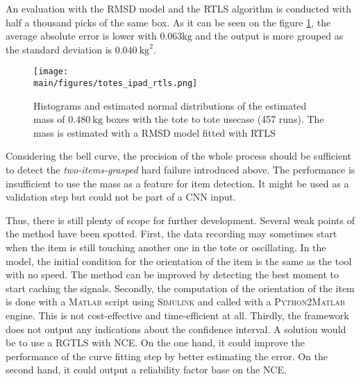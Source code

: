 \documentclass[/home/francois/latex/report/main.tex]{subfiles}
\begin{document}
An evaluation with the \ac{RMSD} model and the \ac{RTLS} algorithm is conducted with half a thousand picks of the same box. As it can be seen on the figure \ref{fig:results:rmsd-rtls-tote}, the average absolute error is lower with $0.063 \si{\kilogram}$ and the output is more grouped as the standard deviation is $0.040 \ \si{\kilogram\squared}$.

\begin{figure}[h]
  \centering
  \texttt{[image: \\main/figures/totes\_ipad\_rtls.png]}
  \caption{Histograms and estimated normal distributions of the estimated mass of $0.480 \ \si{\kilogram}$ boxes with the tote to tote usecase (457 runs). The mass is estimated with a \ac{RMSD} model fitted with \ac{RTLS}}
  \label{fig:results:rmsd-rtls-tote}
\end{figure}

Considering the bell curve, the precision of the whole process should be sufficient to detect the \textit{two-items-grasped} hard failure introduced above. The performance is insufficient to use the mass as a feature for item detection. It might be used as a validation step but could not be part of a \ac{CNN} input.

Thus, there is still plenty of scope for further development. Several weak points of the method have been spotted. First, the data recording may sometimes start when the item is still touching another one in the tote or oscillating. In the model, the initial condition for the orientation of the item is the same as the tool with no speed. The method can be improved by detecting the best moment to start caching the signals. Secondly, the computation of the orientation of the item is done with a \textsc{Matlab} script using \textsc{Simulink} and called with a \textsc{Python2Matlab} engine. This is not cost-effective and time-efficient at all. Thirdly, the framework does not output any indications about the confidence interval. A solution would be to use a \ac{RGTLS} with \ac{NCE}. On the one hand, it could improve the performance of the curve fitting step by better estimating the error. On the second hand, it could output a reliability factor base on the \ac{NCE}.
\end{document}
